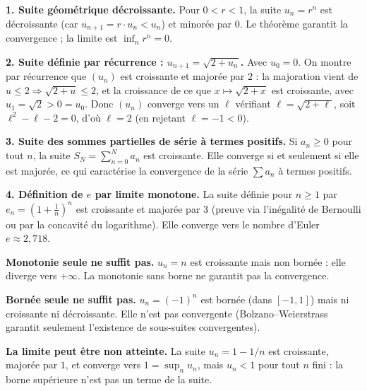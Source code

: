 \begin{mdframed}[style=exbar]
  \textbf{1. Suite géométrique décroissante.}\enspace%
  Pour $0 < r < 1$, la suite $u_n = r^n$ est décroissante (car $u_{n+1} =
  r \cdot u_n < u_n$) et minorée par $0$. Le théorème garantit la
  convergence ; la limite est $\inf_n r^n = 0$.

  \smallskip\noindent
  \textbf{2. Suite définie par récurrence : $u_{n+1} = \sqrt{2 + u_n}$.}\enspace%
  Avec $u_0 = 0$. On montre par récurrence que $(u_n)$ est croissante et
  majorée par $2$ : la majoration vient de $u \leq 2 \Rightarrow \sqrt{2+u}
  \leq 2$, et la croissance de ce que $x \mapsto \sqrt{2+x}$ est croissante,
  avec $u_1 = \sqrt{2} > 0 = u_0$. Donc
  $(u_n)$ converge vers un $\ell$ vérifiant $\ell = \sqrt{2 + \ell}$, soit
  $\ell^2 - \ell - 2 = 0$, d'où $\ell = 2$ (en rejetant $\ell = -1 < 0$).

  \smallskip\noindent
  \textbf{3. Suite des sommes partielles de série à termes positifs.}\enspace%
  Si $a_n \geq 0$ pour tout $n$, la suite $S_N = \sum_{n=0}^{N} a_n$ est
  croissante. Elle converge si et seulement si elle est majorée, ce qui
  caractérise la convergence de la série $\sum a_n$ à termes positifs.

  \smallskip\noindent
  \textbf{4. Définition de $e$ par limite monotone.}\enspace%
  La suite définie pour $n \geq 1$ par $e_n = \left(1 + \frac{1}{n}\right)^n$ est croissante et majorée
  par $3$ (preuve via l'inégalité de Bernoulli ou par la concavité du
  logarithme). Elle converge vers le nombre d'Euler $e \approx 2{,}718$.
\end{mdframed}

\vspace{6pt}

\begin{mdframed}[style=cexbar]
  \textbf{Monotonie seule ne suffit pas.}\enspace%
  $u_n = n$ est croissante mais non bornée : elle diverge vers $+\infty$.
  La monotonie sans borne ne garantit pas la convergence.

  \smallskip\noindent
  \textbf{Bornée seule ne suffit pas.}\enspace%
  $u_n = {(-1)}^n$ est bornée (dans $[-1,1]$) mais ni croissante ni décroissante.
  Elle n'est pas convergente (Bolzano--Weierstrass garantit seulement l'existence
  de sous-suites convergentes).

  \smallskip\noindent
  \textbf{La limite peut être non atteinte.}\enspace%
  La suite $u_n = 1 - 1/n$ est croissante, majorée par $1$, et converge vers
  $1 = \sup_n u_n$, mais $u_n < 1$ pour tout $n$ fini : la borne supérieure
  n'est pas un terme de la suite.
\end{mdframed}

